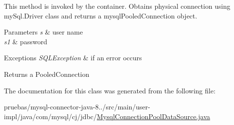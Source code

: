 This method is invoked by the container. Obtains physical connection using my\+Sql.\+Driver class and returns a mysql\+Pooled\+Connection object.


\begin{DoxyParams}{Parameters}
{\em s} & user name \\
\hline
{\em s1} & password \\
\hline
\end{DoxyParams}

\begin{DoxyExceptions}{Exceptions}
{\em S\+Q\+L\+Exception} & if an error occurs \\
\hline
\end{DoxyExceptions}
\begin{DoxyReturn}{Returns}
a Pooled\+Connection 
\end{DoxyReturn}


The documentation for this class was generated from the following file\+:\begin{DoxyCompactItemize}
\item 
pruebas/mysql-\/connector-\/java-\/8../src/main/user-\/impl/java/com/mysql/cj/jdbc/\mbox{\hyperlink{_mysql_connection_pool_data_source_8java}{Mysql\+Connection\+Pool\+Data\+Source.\+java}}\end{DoxyCompactItemize}

